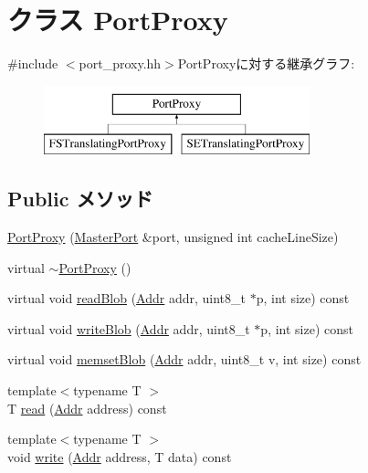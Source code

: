 \hypertarget{classPortProxy}{
\section{クラス PortProxy}
\label{classPortProxy}
}


{\ttfamily \#include $<$port\_\-proxy.hh$>$}PortProxyに対する継承グラフ:\begin{figure}[H]
\begin{center}
\leavevmode
\includegraphics[height=2cm]{classPortProxy}
\end{center}
\end{figure}
\subsection*{Public メソッド}
\begin{DoxyCompactItemize}
\item 
\hyperlink{classPortProxy_a832d66d0a463df34b58086c504afe729}{PortProxy} (\hyperlink{classMasterPort}{MasterPort} \&port, unsigned int cacheLineSize)
\item 
virtual \hyperlink{classPortProxy_a6c560a846e834d2c908fb390eecf420d}{$\sim$PortProxy} ()
\item 
virtual void \hyperlink{classPortProxy_ad63586ad1fa7fd707ea7e03665c25502}{readBlob} (\hyperlink{base_2types_8hh_af1bb03d6a4ee096394a6749f0a169232}{Addr} addr, uint8\_\-t $\ast$p, int size) const 
\item 
virtual void \hyperlink{classPortProxy_af68c0d93cdb9ff9c4df789c4c9029709}{writeBlob} (\hyperlink{base_2types_8hh_af1bb03d6a4ee096394a6749f0a169232}{Addr} addr, uint8\_\-t $\ast$p, int size) const 
\item 
virtual void \hyperlink{classPortProxy_ad68c64ee0acd471129b53bbfd59a2f9a}{memsetBlob} (\hyperlink{base_2types_8hh_af1bb03d6a4ee096394a6749f0a169232}{Addr} addr, uint8\_\-t v, int size) const 
\item 
{\footnotesize template$<$typename T $>$ }\\T \hyperlink{classPortProxy_adf1f83afbd5cc115dfb7b36d85c6c0f4}{read} (\hyperlink{base_2types_8hh_af1bb03d6a4ee096394a6749f0a169232}{Addr} address) const 
\item 
{\footnotesize template$<$typename T $>$ }\\void \hyperlink{classPortProxy_ab308283d9164c7743ad1cb192a3f2e14}{write} (\hyperlink{base_2types_8hh_af1bb03d6a4ee096394a6749f0a169232}{Addr} address, T data) const 
\end{DoxyCompactItemize}
